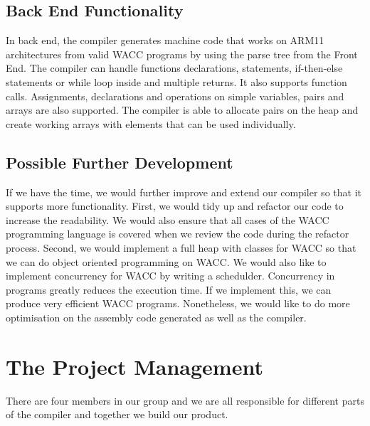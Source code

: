\documentclass[a4paper]{article}
\theoremstyle{definition}
\begin{document}
\subsection{Back End Functionality}
In back end, the compiler generates machine code that works on ARM11 architectures from valid WACC programs by using the parse tree from the Front End. The compiler can handle functions declarations, statements, if-then-else statements or while loop inside and multiple returns. It also supports function calls.
Assignments, declarations and operations on simple variables, pairs and arrays are also supported. The compiler is able to allocate pairs on the heap and create working arrays with elements that can be used individually.


\subsection{Possible Further Development}
If we have the time, we would further improve and extend our compiler so that it supports more functionality.
First, we would tidy up and refactor our code to increase the readability. We would also ensure that all cases of the WACC programming language is covered when we review the code during the refactor process. 
Second, we would implement a full heap with classes for WACC so that we can do object oriented programming on WACC.
We would also like to implement concurrency for WACC by writing a schedulder. Concurrency in programs greatly reduces the execution time. If we implement this, we can produce very efficient WACC programs.
Nonetheless, we would like to do more optimisation on the assembly code generated as well as the compiler. 



\section{The Project Management}
There are four members in our group and we are all responsible for different parts of the compiler and together we build our product.
\end{document}
